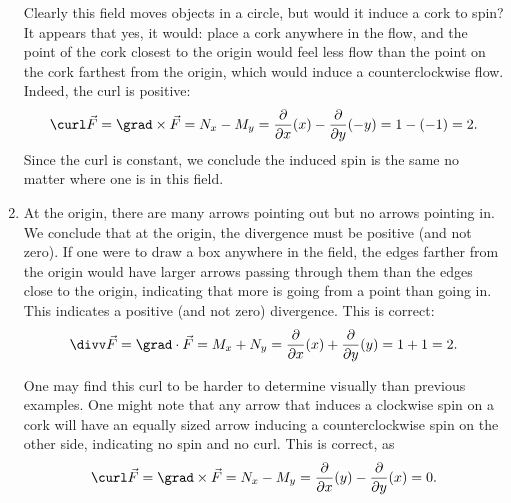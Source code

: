 \begin{example}
\begin{enumerate}
		Clearly this field moves objects in a circle, but would it induce a cork to spin? It appears that yes, it would: place a cork anywhere in the flow, and the point of the cork closest to the origin would feel less flow than the point on the cork farthest from the origin, which would induce a counterclockwise flow. Indeed, the curl is positive:
	\[
	\curl \vec F = \grad\times\vec F = N_x-M_y
	= \frac{\partial}{\partial x}(x) - \frac{\partial}{\partial y}(-y) = 1-(-1) = 2.
	\]
	Since the curl is constant, we conclude the induced spin is the same no matter where one is in this field.
	
		\item
%
%
		 At the origin, there are many arrows pointing out but no arrows pointing in. We conclude that at the origin, the divergence must be positive (and not zero). If one were to draw a box anywhere in the field, the edges farther from the origin would have larger arrows passing through them than the edges close to the origin, indicating that more is going from a point than going in. This indicates a positive (and not zero) divergence. This is correct:
	\[
	\divv\vec F = \grad \cdot \vec F
	= M_x + N_y = \frac{\partial}{\partial x}(x) + \frac{\partial}{\partial y}(y)
	= 1+1=2.
	\]
	
	One may find this curl to be harder to determine visually than previous examples. One might note that any arrow that induces a clockwise spin on a cork will have an equally sized arrow inducing a counterclockwise spin on the other side, indicating no spin and no curl. This is correct, as
	\[
	\curl \vec F = \grad\times\vec F
	= N_x-M_y = \frac{\partial}{\partial x}(y) - \frac{\partial}{\partial y}(x) = 0.
	\]
	

\end{enumerate}
\end{example}
